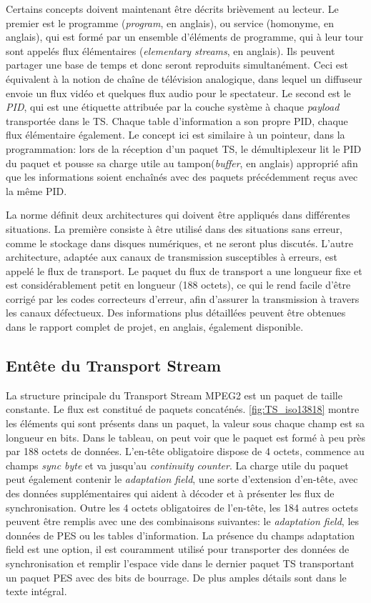 \documentclass[12pt,a4paper]{article}
\begin{document}
Certains concepts doivent maintenant être décrits brièvement au lecteur. Le premier est le programme (\textit{program}, en anglais), ou service (homonyme, en anglais), qui est formé par un ensemble d'éléments de programme, qui à leur tour sont appelés flux élémentaires (\textit{elementary streams}, en anglais). Ils peuvent partager une base de temps et donc seront reproduits simultanément. Ceci est équivalent à la notion de chaîne de télévision analogique, dans lequel un diffuseur envoie un flux vidéo et quelques flux audio pour le spectateur. Le second est le \textit{PID}, qui est une étiquette attribuée par la couche système à chaque \textit{payload} transportée dans le TS. Chaque table d'information a son propre PID, chaque flux élémentaire également. Le concept ici est similaire à un pointeur, dans la programmation: lors de la réception d'un paquet TS, le démultiplexeur lit le PID du paquet et pousse sa charge utile au tampon(\textit{buffer}, en anglais) approprié afin que les informations soient  enchaînés avec des paquets précédemment reçus avec la même PID.

La norme définit deux architectures qui doivent être appliqués dans différentes situations. La première consiste à être utilisé dans des situations sans erreur, comme le stockage dans disques numériques, et ne seront plus discutés. L'autre architecture, adaptée aux canaux de transmission susceptibles à erreurs, est appelé le flux de transport. Le paquet du flux de transport a une longueur fixe et est considérablement petit en longueur (188 octets), ce qui le rend facile d'être corrigé par les codes correcteurs d'erreur, afin d'assurer la transmission à travers les canaux défectueux. Des informations plus détaillées peuvent être obtenues dans le rapport complet de projet, en anglais, également disponible.

\subsection{Entête du Transport Stream}
\label{ts_header}

La structure principale du Transport Stream MPEG2 est un paquet de taille constante. Le flux est constitué de paquets concaténés. \autoref{fig:TS_iso13818} montre les éléments qui sont présents dans un paquet, la valeur sous chaque champ est sa longueur en bits. Dans le tableau, on peut voir que le paquet est formé à peu près par 188 octets de données. L'en-tête obligatoire dispose de 4 octets, commence au champs \textit{sync byte} et va jusqu'au \textit{continuity counter}. La charge utile du paquet peut également contenir le \textit{adaptation field}, une sorte d'extension d'en-tête, avec des données supplémentaires qui aident à décoder et à présenter les flux de synchronisation. Outre les 4 octets obligatoires de l'en-tête, les 184 autres octets peuvent être remplis avec une des combinaisons suivantes: le \textit{adaptation field}, les données de PES ou les tables d'information. La présence du champs adaptation field est une option, il est couramment utilisé pour transporter des données de synchronisation et remplir l'espace vide dans le dernier paquet TS transportant un paquet PES avec des bits de bourrage. De plus amples détails sont dans le texte intégral.
\end{document}
